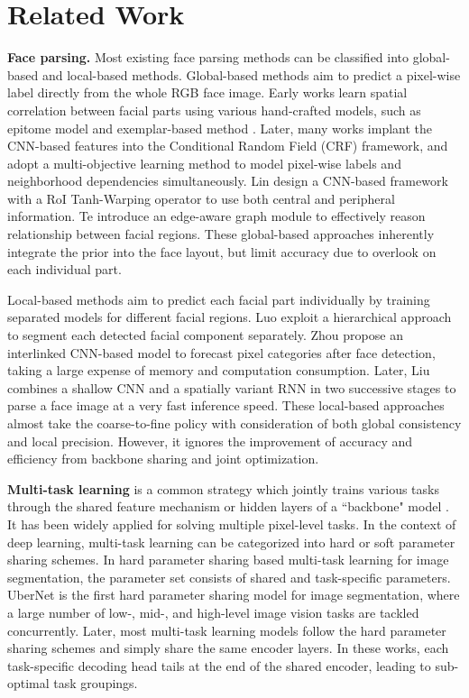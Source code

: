 \documentclass[10pt,twocolumn,letterpaper]{article}
\begin{document}
\section{Related Work}

\noindent\textbf{Face parsing.} Most existing face parsing methods can be classified into global-based and local-based methods.
Global-based methods aim to predict a pixel-wise label directly from the whole RGB face image. Early works learn spatial correlation between facial parts using various hand-crafted models, such as epitome model \cite{Labelfaces} and exemplar-based method \cite{helen}. Later, many works \cite{multi_objective, cnn_cascade, Zhou2017FacePV, adaptive_field} implant the CNN-based features into the Conditional Random Field (CRF) framework, and adopt a multi-objective learning method to model pixel-wise labels and neighborhood dependencies simultaneously. Lin \etal \cite{roiTanh} design a CNN-based framework with a RoI Tanh-Warping operator to use both central and peripheral information. Te \etal \cite{te2020edge} introduce an edge-aware graph module to effectively reason relationship between facial regions. These global-based approaches inherently integrate the prior into the face layout, but limit accuracy due to overlook on each individual part.

Local-based methods aim to predict each facial part individually by training separated models for different facial regions. Luo \etal \cite{hierarchical_luo} exploit a hierarchical approach to segment each detected facial component separately. Zhou \etal \cite{icnn} propose an interlinked CNN-based model to forecast pixel categories after face detection, taking a large expense of memory and computation consumption. Later, Liu \etal \cite{lius} combines a shallow CNN and a spatially variant RNN in two successive stages to parse a face image at a very fast inference speed. These local-based approaches almost take the coarse-to-fine policy with consideration of both global consistency and local precision. However, it ignores the improvement of accuracy and efficiency from backbone sharing and joint optimization.

\noindent\textbf{Multi-task learning} is a common strategy which jointly trains various tasks through the shared feature mechanism or hidden layers of a ``backbone" model \cite{multi_task}. 
It has been widely applied for solving multiple pixel-level tasks. In the context of deep learning, multi-task learning can be categorized into hard or soft parameter sharing schemes.
In hard parameter sharing based multi-task learning for image segmentation, the parameter set consists of shared and task-specific parameters. UberNet \cite{ubernet} is the first hard parameter sharing model for image segmentation, where a large number of low-, mid-, and high-level image vision tasks are tackled concurrently. Later, most multi-task learning models \cite{Kendall_2018_CVPR, Neven2017FastSU, MultiNet} follow the hard parameter sharing schemes and simply share the same encoder layers. In these works, each task-specific decoding head tails at the end of the shared encoder, leading to sub-optimal task groupings.
\end{document}
